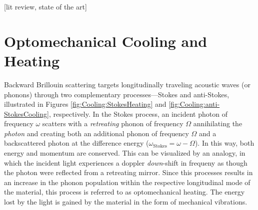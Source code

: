[lit review, state of the art]


\section{Optomechanical Cooling and Heating}
\label{sec:Cooling:Cooling-Heating}

Backward Brillouin scattering targets longitudinally traveling acoustic waves (or phonons) through two complementary processes---Stokes and anti-Stokes, illustrated in Figures \ref{fig:Cooling:StokesHeating} and \ref{fig:Cooling:anti-StokesCooling}, respectively. In the Stokes process, an incident photon of frequency \(\omega\) scatters with a \textit{retreating} phonon of frequency \(\Omega\) annihilating the \textit{photon} and creating both an additional phonon of frequency \(\Omega\) and a backscattered photon at the difference energy (\(\omega_{\mathrm{Stokes}} = \omega - \Omega\)). In this way, both energy and momentum are conserved. This can be visualized by an analogy, in which the incident light experiences a doppler \textit{down}-shift in frequeny as though the photon were reflected from a retreating mirror. Since this processes results in an increase in the phonon population within the respective longitudinal mode of the material, this process is referred to as optomechanical heating. The energy lost by the light is gained by the material in the form of mechanical vibrations.

